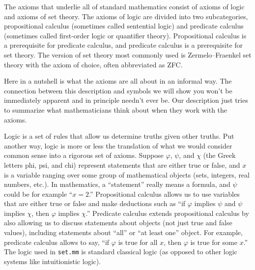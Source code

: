 The axioms that underlie all of standard mathematics consist of axioms of logic
and axioms of set theory. The axioms of logic are divided into two
subcategories, propositional calculus (sometimes
called sentential logic) and predicate calculus
(sometimes called first-order logic or quantifier theory).  Propositional
calculus is a prerequisite for predicate calculus, and predicate calculus is a
prerequisite for set theory.  The version of set theory most commonly used is
Zermelo--Fraenkel set theory
with the axiom of choice,
often abbreviated as ZFC.

Here in a nutshell is what the axioms are all about in an informal way. The
connection between this description and symbols we will show you won't be
immediately apparent and in principle needn't ever be.  Our description just
tries to summarize what mathematicians think about when they work with the
axioms.

Logic is a set of rules that allow us determine truths given other truths.
Put another way,
logic is more or less the translation of what we would consider common sense
into a rigorous set of axioms.  Suppose $\varphi$,
$\psi$, and $\chi$ (the Greek letters phi, psi, and chi) represent statements
that are either true or false, and $x$ is a variable ranging over some group of mathematical objects (sets, integers,
real numbers, etc.). In mathematics, a ``statement'' really means a formula,
and $\psi$ could be for example ``$x = 2$.''
Propositional calculus
allows us to use variables that are either true or false
and make deductions such as
``if $\varphi$ implies $\psi$ and $\psi$ implies $\chi$, then $\varphi$
implies $\chi$.''
Predicate calculus
extends propositional calculus by also allowing us
to discuss statements about objects (not just true and false values), including
statements about ``all'' or ``at least one'' object.
For example, predicate calculus allows to say,
``if $\varphi$ is true for all $x$, then $\varphi$ is true for some $x$.''
The logic used in \texttt{set.mm} is standard classical logic
(as opposed to other logic systems like intuitionistic logic).

